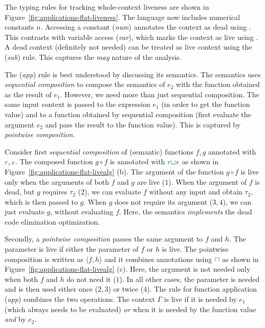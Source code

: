 The typing rules for tracking whole-context liveness are shown in Figure~\ref{fig:applications-flat-liveness}.
The language now includes numerical constants $n$. Accessing a constant (\emph{num}) annotates
the context as dead using . This contrasts with variable access (\emph{var}), which marks the
context as live using . A dead context (definitely not needed) can be treated as live context
using the (\emph{sub}) rule. This captures the \emph{may} nature of the analysis.

The (\emph{app}) rule is best understood by discussing its semantics. The semantics uses
\emph{sequential composition} to compose the semantics of $e_2$ with the function obtained
as the result of $e_1$. However, we need more than just sequential composition. The same input
context is passed to the expression $e_1$ (in order to get the function value) and to a function
obtained by sequential composition (first evaluate the argument $e_2$ and pass the result to the
function value). This is captured by \emph{pointwise composition}.

Consider first \emph{sequential composition} of (semantic) functions $f, g$ annotated with
$\cclrd{r}, \cclrd{s}$. The composed function $g \circ f$ is annotated with $\cclrd{r} \cclrd{\sqcup} \cclrd{s}$
as shown in Figure~\ref{fig:applications-flat-livealg} (b).
The argument of the function $g \circ f$ is live only when the arguments of both $f$ and $g$ are
live ($1$). When the argument of $f$ is dead, but $g$ requires $\tau_2$ ($2$), we can evaluate
$f$ without any input and obtain $\tau_2$, which is then passed to $g$. When $g$ does not require
its argument ($3, 4$), we can just evaluate $g$, without evaluating $f$. Here, the semantics
\emph{implements} the dead code elimination optimization.

Secondly, a \emph{pointwise composition} passes the same argument to $f$ and $h$. The parameter
is live if either the parameter of $f$ or $h$ is live. The pointwise composition is written as
$\langle f, h \rangle$ and it combines annotations using $\cclrd{\sqcap}$ as shown in Figure~\ref{fig:applications-flat-livealg} (c).
Here, the argument is not needed only when both $f$ and $h$ do not need it ($1$). In all other cases,
the parameter is needed and is then used either once ($2,3$) or twice ($4$). The rule for function
application (\emph{app}) combines the two operations. The context $\Gamma$ is live if it is needed by
$e_1$ (which always needs to be evaluated) \emph{or} when it is needed by the function value \emph{and}
by $e_2$.

